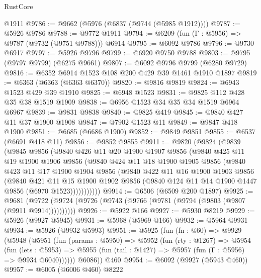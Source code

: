 \begin{lexlean}{RustCore}
\begin{coremodule}
    @1911
@9786 := @9662 (@5976 (@6837 (@9744 (@5985 @1912))))
@9787 := @5926 @9786
@9788 := @9772 @1911
@9794 := @6209 (fun (Γ : @5956) => @9787 (@9732 (@9751 @9788))) @6914
@9795 := @6092 @9786
@9796 := @9730 @6917
@9797 := @5926 @9796
@9799 := @6920 @9750 @9788
@9803 := @9795 (@9797 @9799) (@6275 @9661)
@9807 := @6092 @9796 @9799 (@6280 @9729)
@9816 := @6352 @6914 @1523 @108 @200 @429 @39 @1461 @1910 @1897
@9819 := @6363 (@6363 (@6363 @6370))
@9820 := @9816 @9819
@9824 := @6943 @1523 @429 @39 @1910
@9825 := @6948 @1523
@9831 := @9825 @112 @428 @35 @38 @1519 @1909
@9838 := @6956 @1523 @34 @35 @34 @1519 @6964 @6967
@9839 := @9831 @9838
@9840 := @9825 @419
@9845 := @9840 @427 @11 @37 @1900 @1908
@9847 := @7902 @1523 @11
@9849 := @9847 @418 @1900
@9851 := @6685 (@6686 @1900)
@9852 := @9849 @9851
@9855 := @6537 (@6691 @418 @11)
@9856 := @9852 @9855
@9911 := @9820
    (@9824
      (@9839
        (@9845
          @9856
          (@9840
            @426
            @11
            @20
            @1900
            @1907
            @9856
            (@9840
              @425
              @11
              @19
              @1900
              @1906
              @9856
              (@9840
                @424
                @11
                @18
                @1900
                @1905
                @9856
                (@9840
                  @423
                  @11
                  @17
                  @1900
                  @1904
                  @9856
                  (@9840
                    @422
                    @11
                    @16
                    @1900
                    @1903
                    @9856
                    (@9840
                      @421
                      @11
                      @15
                      @1900
                      @1902
                      @9856
                      (@9840 @124 @11 @14 @1900 @1447 @9856 (@6970 @1523)))))))))))
@9914 := @6506 (@6509 @200 @1897)
@9925 := @9681 (@9722 (@9724 (@9726 (@9743 (@9766 (@9781 (@9794 (@9803 (@9807 (@9911 @9914))))))))))
@9926 := @5922 @166
@9927 := @5930 @8219
@9929 := @5926 (@9927 @5945)
@9931 := @5968 (@5969 @166)
@9932 := @5964 @9931
@9934 := @5926 (@9932 @5993)
@9951 := @5925
    (fun (fn : @60) =>
    @9929
      (@5948
        (@5951
          (fun (params : @5950) =>
          @5952
            (fun (rty : @1267) =>
            @5954
              (fun (lets : @5953) =>
              @5955 (fun (tail : @1427) => @5957 (fun (Γ : @5956) => @9934 @6040))))))
        @6086))
    @460
@9954 := @6092 (@9927 (@5943 @460))
@9957 := @6005 (@6006 @460) @8222

\end{coremodule}
\end{lexlean}
